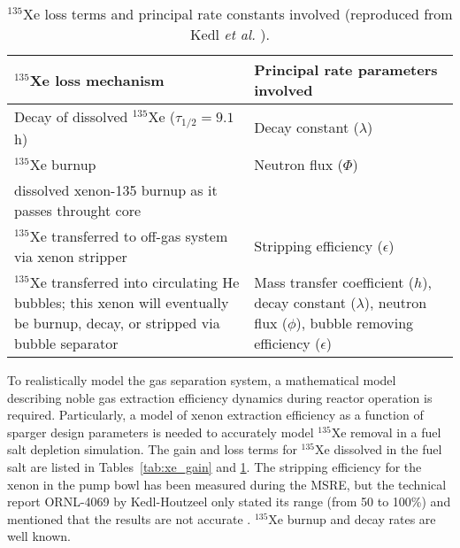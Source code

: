 \begin{table}[b]
	\caption{$^{135}$Xe loss terms and principal rate constants involved
		(reproduced from Kedl \emph{et al.} \cite{kedl_development_1967}).}
	\centering
	\begin{tabularx}{\textwidth}{b b}
		\hline \textbf{$^{135}$Xe loss mechanism}      & \textbf{Principal 
		rate 
			parameters involved}  	\\
		\hline Decay of dissolved $^{135}$Xe ($\tau_{1/2}=9.1$ h)  & Decay 
		constant	($\lambda$)		\\
		\hline $^{135}$Xe burnup              &  Neutron flux 
		($\Phi$)		 					\\
		dissolved xenon-135 burnup as it passes throught core  
		& 			            \\		\hline $^{135}$Xe transferred to 
		off-gas system via xenon stripper & Stripping efficiency 
		($\epsilon$)		\\
		\hline $^{135}$Xe transferred into circulating He bubbles; this xenon 
		will eventually be burnup, decay, or stripped via bubble separator & 
		Mass transfer coefficient ($h$), decay constant ($\lambda$), 
		neutron flux ($\phi$), bubble removing efficiency ($\epsilon$)		\\
		\hline 
	\end{tabularx}
	\label{tab:xe_loss}
\end{table}

To realistically model the gas separation system, a mathematical model 
describing noble gas extraction efficiency dynamics during reactor operation 
is required. Particularly, a model of xenon extraction efficiency as a 
function of sparger design parameters is needed to accurately model 
$^{135}$Xe removal in a fuel salt depletion simulation. The gain and loss 
terms for $^{135}$Xe dissolved in the fuel salt are listed in 
Tables~\ref{tab:xe_gain} and \ref{tab:xe_loss}. The stripping efficiency for 
the xenon in the pump bowl has been measured during the \gls{MSRE}, but the 
technical report ORNL-4069 by Kedl-Houtzeel only stated its range (from 50 to 
100\%) and mentioned that the results are not accurate 
\cite{kedl_development_1967}. $^{135}$Xe burnup and decay rates are well 
known. 

